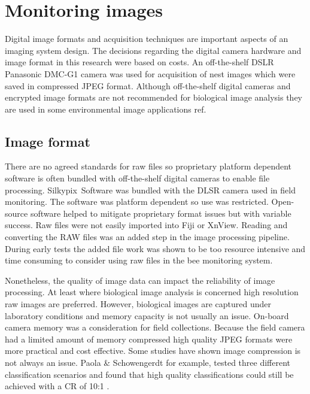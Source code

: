 \section{Monitoring images}
Digital image formats and acquisition techniques are important aspects of an imaging system design. The decisions regarding the digital camera hardware and image format in this research were based on costs. An off-the-shelf \ac{DSLR} Panasonic DMC-G1 camera was used for acquisition of nest images which were saved in compressed JPEG format. Although off-the-shelf digital cameras and encrypted image formats are not recommended for biological image analysis they are used in some environmental image applications {ref}.

\subsection{Image format}
There are no agreed standards for raw files so proprietary platform dependent software is often bundled with off-the-shelf digital cameras to enable file processing. Silkypix\texttrademark~Software was bundled with the DLSR camera used in field monitoring. The software was platform dependent so use was restricted. Open-source software helped to mitigate proprietary format issues but with variable success. Raw files were not easily imported into Fiji or XnView. Reading and converting the RAW files was an added step in the image processing pipeline. During early tests the added file work was shown to be too resource intensive and time consuming to consider using raw files in the bee monitoring system. 

Nonetheless, the quality of image data can impact the reliability of image processing. At least where biological image analysis is concerned high resolution raw images are preferred. However, biological images are captured under laboratory conditions and memory capacity is not usually an issue. On-board camera memory was a consideration for field collections. Because the field camera had a limited amount of memory compressed high quality JPEG formats were more practical and cost effective. Some studies have shown image compression is not always an issue. Paola \& Schowengerdt \cite{Paola1995} for example, tested three different classification scenarios and found that high quality classifications could still be achieved with a \ac{CR} of 10:1 \cite{Paola1995}. 

